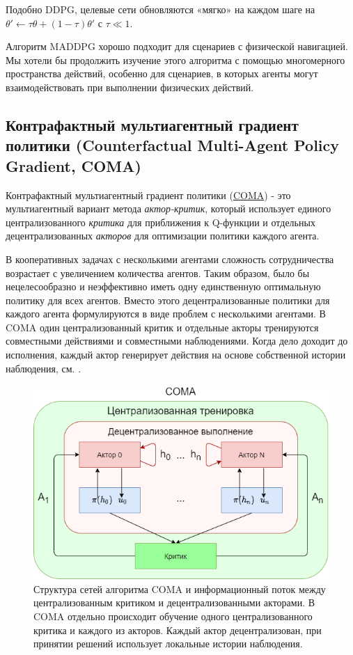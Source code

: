 Подобно DDPG, целевые сети обновляются «мягко» на каждом шаге на $\theta' \leftarrow \tau \theta + (1 - \tau) \theta'$ с $\tau \ll 1$.

Алгоритм MADDPG хорошо подходит для сценариев с физической навигацией. Мы хотели бы продолжить изучение этого алгоритма с помощью многомерного пространства действий, особенно для сценариев, в которых агенты могут взаимодействовать при выполнении физических действий.

\subsection{Контрафактный мультиагентный градиент политики (Counterfactual Multi-Agent Policy Gradient, COMA)}

Контрафактный мультиагентный градиент политики (\hyperref[acr:coma]{COMA}) - это мультиагентный вариант метода \textit{актор-критик}, который использует единого централизованного \textit{критика} для приближения к Q-функции и отдельных децентрализованных \textit{акторов} для оптимизации политики каждого агента. \cite{foerster2017counterfactual}

В кооперативных задачах с несколькими агентами сложность сотрудничества возрастает с увеличением количества агентов. Таким образом, было бы нецелесообразно и неэффективно иметь одну единственную оптимальную политику для всех агентов. Вместо этого децентрализованные политики для каждого агента формулируются в виде проблем с несколькими агентами. В COMA один централизованный критик и отдельные акторы тренируются совместными действиями и совместными наблюдениями. Когда дело доходит до исполнения, каждый актор генерирует действия на основе собственной истории наблюдения, см. .

\begin{figure}[ht!]
    \center
    \includegraphics [scale=0.80] {my_folder/images/ch2/coma.png}
    \caption{Структура сетей алгоритма COMA и информационный поток между централизованным критиком и децентрализованными акторами. В COMA отдельно происходит обучение одного централизованного критика и каждого из акторов. Каждый актор децентрализован, при принятии решений использует локальные истории наблюдения. \cite{foerster2017counterfactual}}
    \label{fig:ch2-coma}
\end{figure}

